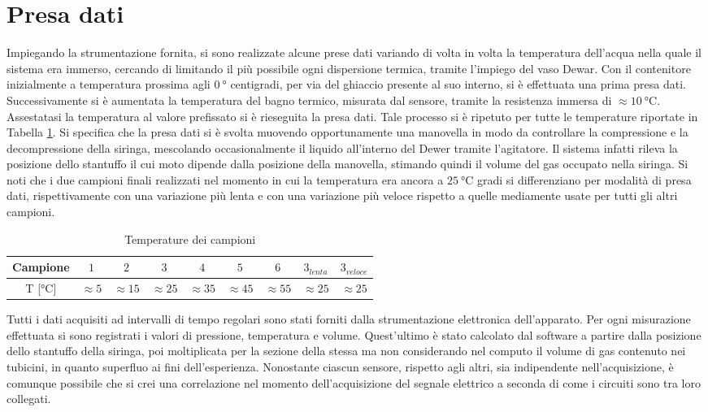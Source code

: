 \documentclass[a4paper,11pt,oneside]{article}
\begin{document}
\section{Presa dati}
Impiegando la strumentazione fornita, si sono realizzate alcune prese dati variando di volta in volta la temperatura dell'acqua nella quale il sistema era immerso, cercando di limitando il più possibile ogni dispersione termica, tramite l'impiego del vaso Dewar. Con il contenitore inizialmente a temperatura prossima agli $\SI{0}{\degree}$ centigradi, per via del ghiaccio presente al suo interno, si è effettuata una prima presa dati. Successivamente si è aumentata la temperatura del bagno termico, misurata dal sensore, tramite la resistenza immersa di $\approx\SI{10}{\celsius}$. Assestatasi la temperatura al valore prefissato si è rieseguita la presa dati. Tale processo si è ripetuto per tutte le temperature riportate in Tabella \ref{tab:camp_temp}. Si specifica che la presa dati si è svolta muovendo opportunamente una manovella in modo da controllare la compressione e la decompressione della siringa, mescolando occasionalmente il liquido all'interno del Dewer tramite l'agitatore. Il sistema infatti rileva la posizione dello stantuffo il cui moto dipende dalla posizione della manovella, stimando quindi il volume del gas occupato nella siringa. Si noti che i due campioni finali realizzati nel momento in cui la temperatura era ancora a $\SI{25}{\celsius}$ gradi si differenziano per modalità di presa dati, rispettivamente con una variazione più lenta e con una variazione più veloce rispetto a quelle mediamente usate per tutti gli altri campioni.

\begin{table}[h!]
    \centering
    \begin{tabular}{|c|c|c|c|c|c|c|c|c|}
        \hline
        Campione & $1$ & $2$ & $3$ & $4$ & $5$ & $6$ & $3_{lenta}$ & $3_{veloce}$\\\hline
        \rowcolor[rgb]{0.85,0.85,0.85} T [$\si{\celsius}$] & $\approx5$ & $\approx15$ & $\approx25$ & $\approx35$ & $\approx45$ & $\approx55$ & $\approx25$ & $\approx25$ \\\hline
    \end{tabular}
    \caption{Temperature dei campioni}
    \label{tab:camp_temp}
\end{table}

Tutti i dati acquisiti ad intervalli di tempo regolari sono stati forniti dalla strumentazione elettronica dell'apparato. Per ogni misurazione effettuata si sono registrati i valori di pressione, temperatura e volume. Quest'ultimo è stato calcolato dal software a partire dalla posizione dello stantuffo della siringa, poi moltiplicata per la sezione della stessa ma non considerando nel computo il volume di gas contenuto nei tubicini, in quanto superfluo ai fini dell'esperienza. Nonostante ciascun sensore, rispetto agli altri, sia indipendente nell'acquisizione, è comunque possibile che si crei una correlazione nel momento dell'acquisizione del segnale elettrico a seconda di come i circuiti sono tra loro collegati.\newline
\end{document}
